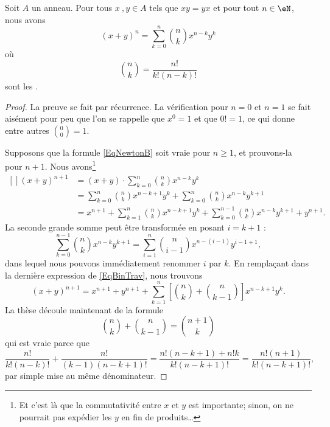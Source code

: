 \begin{proposition}     \label{PropBinomFExOiL}
Soit \( A \) un anneau. Pour tous \(x\ , y\in A\) tels que \(xy = yx \) et pour tout \( n\in\eN \), nous avons
\begin{equation}        \label{EqNewtonB}
    (x+y)^n=\sum_{k=0}^n{n\choose k}x^{n-k}y^k
\end{equation}
où
\begin{equation}
    {n\choose k}=\frac{ n! }{ k!(n-k)! }
\end{equation}
sont les .
\end{proposition}

\begin{proof}
    La preuve se fait par récurrence. La vérification pour $n=0$ et $n=1$ se fait aisément pour peu que l'on se rappelle que \( x^0=1\) et que \( 0!=1\), ce qui donne entre autres \( {0\choose 0}=1\).

    Supposons que la formule \eqref{EqNewtonB} soit vraie pour $n\geq1$, et prouvons-la pour $n+1$. Nous avons\footnote{Et c'est là que la commutativité entre $x$ et $y$ est importante; sinon, on ne pourrait pas expédier les $y$ en fin de produits\dots}
\begin{equation}        \label{EqBinTrav}
    \begin{aligned}[]
        (x+y)^{n+1} &=(x+y)\cdot  \sum_{k=0}^n{n\choose k}x^{n-k}y^k\\
                &= \sum_{k=0}^n{n\choose k}x^{n-k+1}y^k+\sum_{k=0}^n{n\choose k}x^{n-k}y^{k+1}\\
                &=x^{n+1}+ \sum_{k=1}^n{n\choose k}x^{n-k+1}y^k+\sum_{k=0}^{n-1}{n\choose k}x^{n-k}y^{k+1}+y^{n+1}.
    \end{aligned}
\end{equation}
La seconde grande somme peut être transformée en posant $i=k+1$ :
\begin{equation}
    \sum_{k=0}^{n-1}{n\choose k}x^{n-k}y^{k+1}  =\sum_{i=1}^n{n\choose i-1}x^{n-(i-1)}y^{i-1+1},
\end{equation}
dans lequel nous pouvons immédiatement renommer $i$ par $k$. En remplaçant dans la dernière expression de \eqref{EqBinTrav}, nous trouvons
\begin{equation}
    (x+y)^{n+1}=x^{n+1}+y^{n+1}+\sum_{k=1}^n\left[ {n\choose k}+{n\choose k-1} \right]x^{n-k+1}y^k.
\end{equation}
La thèse découle maintenant de la formule
\begin{equation}
    {n\choose k}+{n\choose k-1}={n+1\choose k}
\end{equation}
qui est vraie parce que
\begin{equation}
    \frac{ n! }{ k!(n-k)! }+\frac{ n! }{ (k-1)(n-k+1)! }=\frac{ n!(n-k+1)+n!k }{ k!(n-k+1)! }=\frac{ n!(n+1) }{  k!(n-k+1)!  },
\end{equation}
par simple mise au même dénominateur.
\end{proof}

